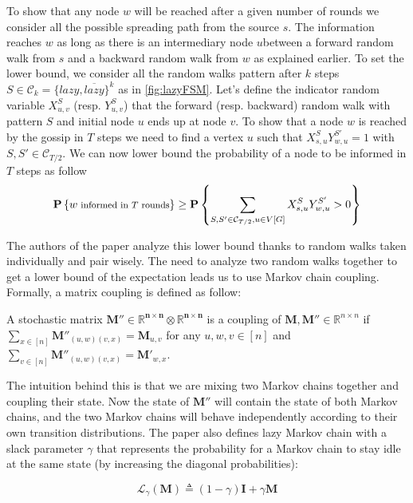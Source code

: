 \documentclass[10pt,journal,a4paper]{IEEEtran}
\begin{document}
To show that any node $w$ will be reached after a given number of rounds we consider all the possible spreading path from the source $s$. The information reaches $w$ as long as there is an intermediary node $u$between a forward random walk from $s$ and a backward random walk from $w$ as explained earlier. To set the lower bound, we consider all the random walks pattern after $k$ steps $S \in \mathcal C_k = \{ lazy, \overline{lazy} \}^k$ as in \cref{fig:lazyFSM}. Let's define the indicator random variable $X_{u,v}^S$ (resp. $Y_{u,v}^S$) that the forward (resp. backward) random walk with pattern $S$ and initial node $u$ ends up at node $v$. To show that a node $w$ is reached by the gossip in $T$ steps we need to find a vertex $u$ such that $X_{s,u}^{S}Y_{w,u}^{S'} = 1$ with $S, S' \in \mathcal C_{T/2}$. We can now lower bound the probability of a node to be informed in $T$ steps as follow
\begin{align*}
  \scriptsize
  \P{w \text{ informed in $T$ rounds}} \geq \P{\sum_{S,S'\in \mathcal C_{T/2}, u\in V[G]} X_{s,u}^S Y_{w,u}^{S'} > 0}
\end{align*}

The authors of the paper analyze this lower bound thanks to random walks taken individually and pair wisely. The need to analyze two random walks together to get a lower bound of the expectation leads us to use Markov chain coupling. Formally, a matrix coupling is defined as follow:

\begin{definition}
  A stochastic matrix $\mathbf{M'' \in \mathbb{R}^{n\times n} \otimes \mathbb{R}^{n\times n}}$ is a coupling of $\mathbf{M,M''} \in \mathbb{R}^{n\times n}$ if $\sum_{x\in[n]} \mathbf{M''}_{(u,w)(v,x)} = \mathbf{M}_{u,v}$ for any $u,w,v \in [n]$ and $\sum_{v\in[n]} \mathbf{M''}_{(u,w)(v,x)} = \mathbf{M'}_{w,x}$.
\end{definition}

The intuition behind this is that we are mixing two Markov chains together and coupling their state. Now the state of $\mathbf{M''}$ will contain the state of both Markov chains, and the two Markov chains will behave independently according to their own transition distributions. The paper \cite{guosun} also defines lazy Markov chain with a slack parameter $\gamma$ that represents the probability for a Markov chain to stay idle at the same state (by increasing the diagonal probabilities):

\[
  \mathcal L _ \gamma (\mathbf{M}) \triangleq (1-\gamma) \mathbf{I} + \gamma \mathbf{M}
\]
\end{document}

